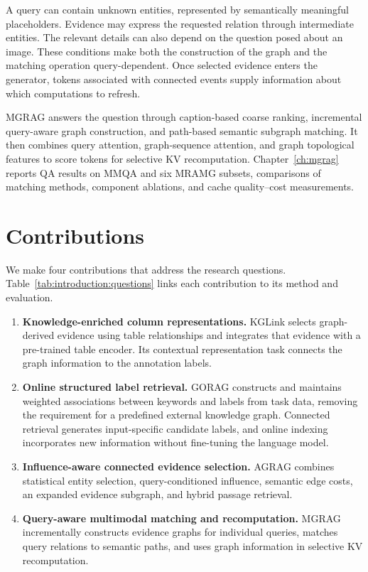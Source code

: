 A query can contain unknown entities, represented by semantically meaningful placeholders. Evidence may express the requested relation through intermediate entities. The relevant details can also depend on the question posed about an image. These conditions make both the construction of the graph and the matching operation query-dependent. Once selected evidence enters the generator, tokens associated with connected events supply information about which computations to refresh.

MGRAG answers the question through caption-based coarse ranking, incremental query-aware graph construction, and path-based semantic subgraph matching. It then combines query attention, graph-sequence attention, and graph topological features to score tokens for selective KV recomputation. Chapter~\ref{ch:mgrag} reports QA results on MMQA and six MRAMG subsets, comparisons of matching methods, component ablations, and cache quality--cost measurements.

\section{Contributions}
\label{sec:introduction:contributions}
We make four contributions that address the research questions. Table~\ref{tab:introduction:questions} links each contribution to its method and evaluation.

\begin{enumerate}
\item \textbf{Knowledge-enriched column representations.} KGLink selects graph-derived evidence using table relationships and integrates that evidence with a pre-trained table encoder. Its contextual representation task connects the graph information to the annotation labels.
\item \textbf{Online structured label retrieval.} GORAG constructs and maintains weighted associations between keywords and labels from task data, removing the requirement for a predefined external knowledge graph. Connected retrieval generates input-specific candidate labels, and online indexing incorporates new information without fine-tuning the language model.
\item \textbf{Influence-aware connected evidence selection.} AGRAG combines statistical entity selection, query-conditioned influence, semantic edge costs, an expanded evidence subgraph, and hybrid passage retrieval.
\item \textbf{Query-aware multimodal matching and recomputation.} MGRAG incrementally constructs evidence graphs for individual queries, matches query relations to semantic paths, and uses graph information in selective KV recomputation.
\end{enumerate}

